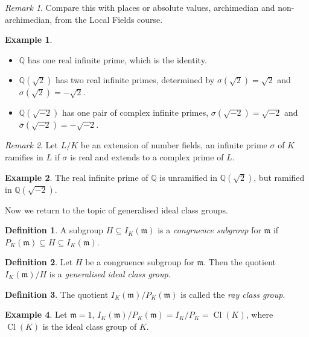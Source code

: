 \documentclass[11pt]{article}
\theoremstyle{definition}
\newtheorem{definition}{Definition}[section]
\newtheorem{example}[definition]{Example}
\newtheorem*{example*}{Example}
\theoremstyle{plain}
\theoremstyle{remark}
\newtheorem*{remark*}{Remark}
\DeclareMathOperator{\Cl}{Cl}
\newcommand{\QQ}{\mathbb{Q}}
\newcommand{\fm}{\mathfrak{m}}
\begin{document}
\begin{remark*}
    Compare this with places or absolute values, archimedian and non-archimedian, from the Local Fields course.
\end{remark*}

\begin{example*}\phantom{}
    \begin{itemize}
        \item $\QQ$ has one real infinite prime, which is the identity.
        \item $\QQ(\sqrt{2})$ has two real infinite primes, determined by $\sigma(\sqrt{2}) = \sqrt{2}$ and $\sigma(\sqrt{2}) = -\sqrt{2}$.
        \item $\QQ(\sqrt{-2})$ has one pair of complex infinite primes, $\sigma(\sqrt{-2}) = \sqrt{-2}$ and $\overline{\sigma}(\sqrt{-2}) = -\sqrt{-2}$.
    \end{itemize}
\end{example*}

\begin{remark*}
    Let $L/K$ be an extension of number fields, an infinite prime $\sigma$ of $K$ ramifies in $L$ if $\sigma$ is real and extends to a complex prime of $L$.
\end{remark*}

\begin{example*}
    The real infinite prime of $\QQ$ is unramified in $\QQ(\sqrt{2})$, but ramified in $\QQ(\sqrt{-2})$.
\end{example*}

\noindent Now we return to the topic of generalised ideal class groups.

\begin{definition}\label{def:2_17}
    A subgroup $H \subseteq I_K(\fm)$ is a \emph{congruence subgroup} for $\fm$ if $P_K(\fm) \subseteq H \subseteq I_K(\fm)$.
\end{definition}

\begin{definition}\label{def:2_18}
    Let $H$ be a congruence subgroup for $\fm$. Then the quotient $I_K(\fm)/H$ is a \emph{generalised ideal class group}.
\end{definition}

\begin{definition}\label{def:2_19}
    The quotient $I_K(\fm)/P_K(\fm)$ is called the \emph{ray class group}.
\end{definition}

\begin{example}\label{eg:2_20}
    Let $\fm = 1$, $I_K(\fm)/P_K(\fm) = I_K/P_K = \Cl(K)$, where $\Cl(K)$ is the ideal class group of $K$.
\end{example}
\end{document}
